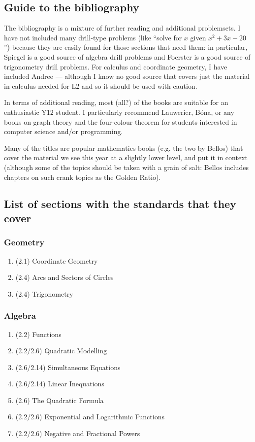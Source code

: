 \subsection*{Guide to the bibliography}
The bibliography is a mixture of further reading and additional problemsets. I have not included many drill-type problems
(like ``solve for $ x $ given $ x^2 + 3x - 20 $'') because they are easily found for those sections that need them: in particular,
Spiegel is a good source of algebra drill problems and Foerster is a good source of trigonometry drill problems. For calculus
and coordinate geometry, I have included Andree --- although I know no good source that covers just the material in calculus needed
for L2 and so it should be used with caution.

In terms of additional reading, most (all?) of the books are suitable for an enthusiastic Y12 student. I particularly recommend
Lauwerier, B\'ona, or any books on graph theory and the four-colour theorem for students interested in computer science and/or programming.

Many of the titles are popular mathematics books (e.g. the two by Bellos) that cover the material we see this year at a slightly lower
level, and put it in context (although some of the topics should be taken with a grain of salt: Bellos includes chapters on such crank
topics as the Golden Ratio).

\subsection*{List of sections with the standards that they cover}
\subsubsection*{Geometry}
\begin{enumerate}
  \item (2.1) Coordinate Geometry
  \item (2.4) Arcs and Sectors of Circles
  \item (2.4) Trigonometry
\end{enumerate}

\subsubsection*{Algebra}
\begin{enumerate}[resume]
  \item (2.2) Functions
  \item (2.2/2.6) Quadratic Modelling
  \item (2.6/2.14) Simultaneous Equations
  \item (2.6/2.14) Linear Inequations
  \item (2.6) The Quadratic Formula
  \item (2.2/2.6) Exponential and Logarithmic Functions
  \item (2.2/2.6) Negative and Fractional Powers
\end{enumerate}

